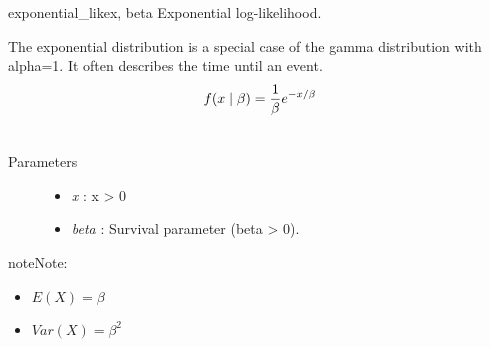 \hypertarget{pymc.distributions.exponential_like}{}\begin{funcdesc}{exponential\_like}{x, beta}
Exponential log-likelihood.

The exponential distribution is a special case of the gamma distribution
with alpha=1. It often describes the time until an event.
\begin{gather}
\begin{split}f(x \mid \beta) = \frac{1}{\beta}e^{-x/\beta}\end{split}\notag\\\begin{split}\end{split}\notag
\end{gather}\begin{description}
\item[Parameters] \leavevmode\begin{itemize}
\item {} 
\emph{x} : x \textgreater{} 0

\item {} 
\emph{beta} : Survival parameter (beta \textgreater{} 0).

\end{itemize}

\end{description}

\begin{notice}{note}{Note:}\begin{itemize}
\item {} 
$E(X) = \beta$

\item {} 
$Var(X) = \beta^2$

\end{itemize}
\end{notice}
\end{funcdesc}

